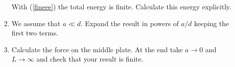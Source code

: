 \begin{enumerate}
\begin{enumerate}
With (\ref{fineee}) the total energy is finite. Calculate this energy explicitly. 

\item
We assume that $a \ll d$. Expand the result in powers of $a/d$ keeping
the first two terms.

\item
Calculate the force on the middle plate. At the end take $a\to 0$ and
$L \to \infty$ and check that your result is finite.

\end{enumerate}
 
\end{enumerate}


